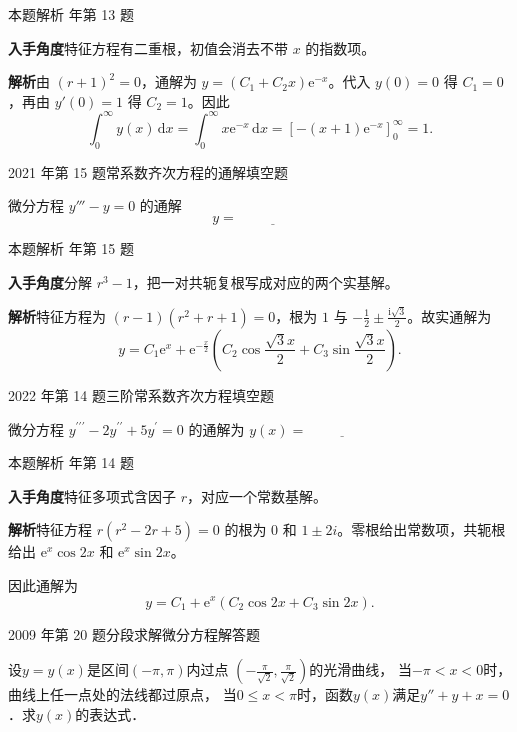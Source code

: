 \documentclass[UTF8,zihao=-4,fontset=fandol]{ctexart}
\newcommand{\blank}{\underline{\hspace{5em}}}
\newcommand{\QuestionPage}[6]{%
  \par\noindent\begin{minipage}{\linewidth}
  \raggedright
  {\small\textcolor{black!60}{#3\quad #5}\hfill\textcolor{accent}{#2}}\par\smallskip}
\newcommand{\QuestionEnd}{\end{minipage}\par\medskip}
\newcommand{\QuestionPage}[6]{%
  \clearpage
  {\small\textcolor{accent}{#1\hfill #2}}\par\medskip
  {\small\textcolor{black!60}{#3\quad #5\hfill #6}}\par\vspace{9bp}}
\newcommand{\QuestionEnd}{}
\newenvironment{QuestionSolution}[1]{%
  \clearpage
  {\small\textcolor{black!60}{本题解析\quad #1}}\par\medskip
}{\par\clearpage}
\begin{document}
\begin{QuestionSolution}{2020 年第 13 题}
\textbf{入手角度}\quad 特征方程有二重根，初值会消去不带 \(x\) 的指数项。

\textbf{解析}\quad 由 \((r+1)^2=0\)，通解为 \(y=(C_1+C_2x)\mathrm{e}^{-x}\)。代入 \(y(0)=0\) 得 \(C_1=0\)，再由 \(y'(0)=1\) 得 \(C_2=1\)。因此
\[
\int_0^\infty y(x)\,\mathrm{d}x
=\int_0^\infty x\mathrm{e}^{-x}\,\mathrm{d}x
=[-(x+1)\mathrm{e}^{-x}]_0^\infty
=\boxed{1}.
\]
\end{QuestionSolution}

\QuestionPage{4.2 高阶线性微分方程}{填空题}{2021 年第 15 题}{2}{常系数齐次方程的通解}{229 / 234}
微分方程 \(y'''-y=0\) 的通解
\[y= \blank{}
\]
\QuestionEnd

\begin{QuestionSolution}{2021 年第 15 题}
\textbf{入手角度}\quad 分解 \(r^3-1\)，把一对共轭复根写成对应的两个实基解。

\textbf{解析}\quad 特征方程为 \((r-1)(r^2+r+1)=0\)，根为 \(1\) 与 \(-\frac{1}{2}\pm \frac{\mathrm{i}\sqrt3}{2}\)。故实通解为
\[
\boxed{y=C_1\mathrm{e}^x+\mathrm{e}^{-\frac{x}{2}}
\left(C_2\cos\frac{\sqrt3x}{2}+C_3\sin\frac{\sqrt3x}{2}\right)}.
\]
\end{QuestionSolution}

\QuestionPage{4.2 高阶线性微分方程}{填空题}{2022 年第 14 题}{2}{三阶常系数齐次方程}{230 / 234}
微分方程
\(y^{\prime\prime\prime} - 2y^{\prime\prime} + 5y^{\prime} = 0\)
的通解为 \(y\left( x \right) = \blank{}\)
\QuestionEnd

\begin{QuestionSolution}{2022 年第 14 题}
\textbf{入手角度}\quad 特征多项式含因子 \(r\)，对应一个常数基解。

\textbf{解析}\quad 特征方程 \(r(r^2-2r+5)=0\) 的根为 \(0\) 和 \(1\pm2i\)。零根给出常数项，共轭根给出 \(\mathrm{e}^x\cos2x\) 和 \(\mathrm{e}^x\sin2x\)。

因此通解为
\[
\boxed{y=C_1+\mathrm{e}^x(C_2\cos2x+C_3\sin2x)}.
\]
\end{QuestionSolution}

\QuestionPage{4.2 高阶线性微分方程}{解答题}{2009 年第 20 题}{4}{分段求解微分方程}{231 / 234}
设$y = y(x)$是区间$(- \pi ,\pi)$内过点
$\left(- \frac{\pi}{\sqrt{2}},\frac{\pi}{\sqrt{2}} \right)$的光滑曲线，
当$- \pi < x < 0$时，曲线上任一点处的法线都过原点，
当$0 \le x < \pi$时，函数$y(x)$满足$y'' + y + x = 0$．求$y(x)$的表达式．
\QuestionEnd
\end{document}
